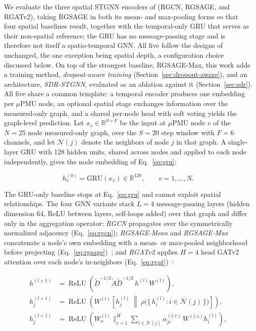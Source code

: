 \documentclass[3p,times,procedia]{elsarticle}
\begin{document}
We evaluate the three spatial STGNN encoders of \cite{Karabulut2026} (RGCN, RGSAGE, and RGATv2), taking RGSAGE in both its mean- and max-pooling forms so that four spatial baselines result, together with the temporal-only GRU that serves as their non-spatial reference; the GRU has no message-passing stage and is therefore not itself a spatio-temporal GNN. All five follow the designs of \cite{Karabulut2026} unchanged, the one exception being spatial depth, a configuration choice discussed below. On top of the strongest baseline, RGSAGE-Max, this work adds a training method, \emph{dropout-aware training} (Section~\ref{sec:dropout-aware}), and an architecture, \emph{SDR-STGNN}, evaluated as an ablation against it (Section~\ref{sec:sdr}). All five share a common template: a temporal encoder produces one embedding per $\mu$PMU node, an optional spatial stage exchanges information over the measured-only graph, and a shared per-node head with soft voting yields the graph-level prediction. Let $x_v\in\mathbb{R}^{S\times F}$ be the input at $\mu$PMU node $v$ of the $N=25$ node measured-only graph, over the $S=20$ step window with $F=6$ channels, and let $\mathcal N(j)$ denote the neighbors of node $j$ in that graph. A single-layer GRU with 128 hidden units, shared across nodes and applied to each node independently, gives the node embedding of Eq.~\eqref{eq:gru}:

\begin{equation}
\label{eq:gru}
h^{(0)}_v = \mathrm{GRU}(x_v) \in \mathbb{R}^{128},
\qquad v=1,\dots,N .
\end{equation}

The GRU-only baseline stops at Eq.~\eqref{eq:gru} and cannot exploit spatial relationships. The four GNN variants stack $L=4$ message-passing layers (hidden dimension 64, ReLU between layers, self-loops added) over that graph and differ only in the aggregation operator: \emph{RGCN} propagates over the symmetrically normalized adjacency (Eq.~\eqref{eq:rgcn}); \emph{RGSAGE-Mean} and \emph{RGSAGE-Max} concatenate a node's own embedding with a mean- or max-pooled neighborhood before projecting (Eq.~\eqref{eq:rgsage})~\cite{Hamilton2017}; and \emph{RGATv2} applies $H=4$ head GATv2 attention over each node's in-neighbors (Eq.~\eqref{eq:rgat})~\cite{Brody2022}:

\begin{align}
\label{eq:rgcn}
h^{(l+1)} &= \operatorname{ReLU}\!\left(
\tilde D^{-1/2}\tilde A\tilde D^{-1/2}\, h^{(l)} W^{(l)} \right), \\
\label{eq:rgsage}
h^{(l+1)}_j &= \operatorname{ReLU}\!\left( W^{(l)}
\left[ h^{(l)}_j \;\middle\|\;
\rho\big(\{\, h^{(l)}_i : i\in\bar{\mathcal N}(j) \,\}\big) \right] \right), \\
\label{eq:rgat}
h^{(l+1)}_j &= \operatorname{ReLU}\!\left( W^{(l)}_{\mathrm o}
\Big\|_{c=1}^{H} \sum_{i\in\bar{\mathcal N}(j)}
\alpha^{(l,c)}_{ji}\, W^{(l,c)} h^{(l)}_i \right),
\end{align}
\end{document}
